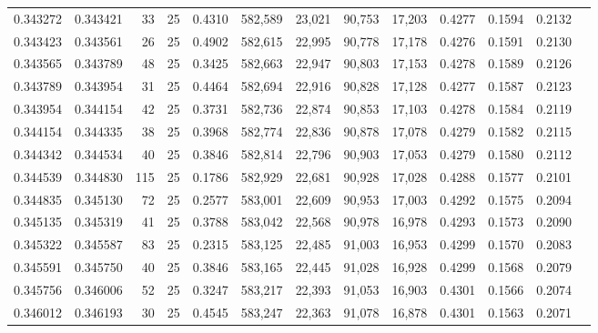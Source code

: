 \begin{tabular}{rrrrrrrrrrrrr}
0.343272 & 0.343421 &    33 &  25 &                                     0.4310 & 582,589 &  23,021 &  90,753 &  17,203 & 0.4277 & 0.1594 & 0.2132 \\
0.343423 & 0.343561 &    26 &  25 &                                     0.4902 & 582,615 &  22,995 &  90,778 &  17,178 & 0.4276 & 0.1591 & 0.2130 \\
0.343565 & 0.343789 &    48 &  25 &                                     0.3425 & 582,663 &  22,947 &  90,803 &  17,153 & 0.4278 & 0.1589 & 0.2126 \\
0.343789 & 0.343954 &    31 &  25 &                                     0.4464 & 582,694 &  22,916 &  90,828 &  17,128 & 0.4277 & 0.1587 & 0.2123 \\
0.343954 & 0.344154 &    42 &  25 &                                     0.3731 & 582,736 &  22,874 &  90,853 &  17,103 & 0.4278 & 0.1584 & 0.2119 \\
0.344154 & 0.344335 &    38 &  25 &                                     0.3968 & 582,774 &  22,836 &  90,878 &  17,078 & 0.4279 & 0.1582 & 0.2115 \\
0.344342 & 0.344534 &    40 &  25 &                                     0.3846 & 582,814 &  22,796 &  90,903 &  17,053 & 0.4279 & 0.1580 & 0.2112 \\
0.344539 & 0.344830 &   115 &  25 &                                     0.1786 & 582,929 &  22,681 &  90,928 &  17,028 & 0.4288 & 0.1577 & 0.2101 \\
0.344835 & 0.345130 &    72 &  25 &                                     0.2577 & 583,001 &  22,609 &  90,953 &  17,003 & 0.4292 & 0.1575 & 0.2094 \\
0.345135 & 0.345319 &    41 &  25 &                                     0.3788 & 583,042 &  22,568 &  90,978 &  16,978 & 0.4293 & 0.1573 & 0.2090 \\
0.345322 & 0.345587 &    83 &  25 &                                     0.2315 & 583,125 &  22,485 &  91,003 &  16,953 & 0.4299 & 0.1570 & 0.2083 \\
0.345591 & 0.345750 &    40 &  25 &                                     0.3846 & 583,165 &  22,445 &  91,028 &  16,928 & 0.4299 & 0.1568 & 0.2079 \\
0.345756 & 0.346006 &    52 &  25 &                                     0.3247 & 583,217 &  22,393 &  91,053 &  16,903 & 0.4301 & 0.1566 & 0.2074 \\
0.346012 & 0.346193 &    30 &  25 &                                     0.4545 & 583,247 &  22,363 &  91,078 &  16,878 & 0.4301 & 0.1563 & 0.2071 \\

\end{tabular}
